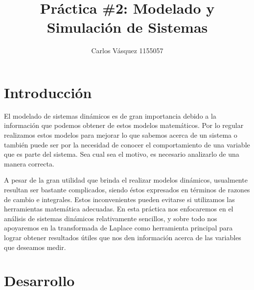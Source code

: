 \documentclass[12pt, letterpaper]{article}
\title{Práctica \#2: Modelado y Simulación de Sistemas}
\author{Carlos Vásquez 1155057}
\begin{document}
\maketitle

\section*{Introducción}

El modelado de sistemas dinámicos es de gran importancia debido a la información que podemos obtener de estos modelos matemáticos. Por lo regular realizamos estos modelos para mejorar lo que sabemos acerca de un sistema o también puede ser por la necesidad de conocer el comportamiento de una variable que es parte del sistema. Sea cual sea el motivo, es necesario analizarlo de una manera correcta.

A pesar de la gran utilidad que brinda el realizar modelos dinámicos, usualmente resultan ser bastante complicados, siendo éstos expresados en términos de razones de cambio e integrales. Estos inconvenientes pueden evitarse si utilizamos las herramientas matemática adecuadas. En esta práctica nos enfocaremos en el análisis de sistemas dinámicos relativamente sencillos, y sobre todo nos apoyaremos en la transformada de Laplace como herramienta principal para lograr obtener resultados útiles que nos den información acerca de las variables que deseamos medir.

\section*{Desarrollo}
\end{document}
